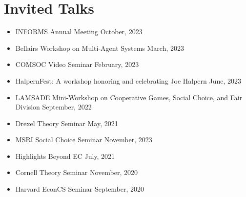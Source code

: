 \documentclass{article}
\begin{document}
    
    \section{Invited Talks}
    \begin{itemize}
    	\item INFORMS Annual Meeting \hfill October, 2023
    	\item Bellairs Workshop on Multi-Agent Systems \hfill March, 2023
    	\item COMSOC Video Seminar \hfill February, 2023
    \end{itemize}
    \begin{itemize}
    	\item HalpernFest: A workshop honoring and celebrating
Joe Halpern \hfill June, 2023
    	\item LAMSADE Mini-Workshop on Cooperative Games, Social Choice, and Fair Division \hfill September, 2022
    \end{itemize}
    
    \begin{itemize}
    	\item Drexel Theory Seminar \hfill May, 2021
    \end{itemize}
    
    \begin{itemize}
    	\item MSRI Social Choice Seminar \hfill November, 2023
    	\item Highlights Beyond EC \hfill July, 2021
    	\item Cornell Theory Seminar \hfill November, 2020
    	\item Harvard EconCS Seminar \hfill September, 2020
    \end{itemize}
    
    
\end{document}
